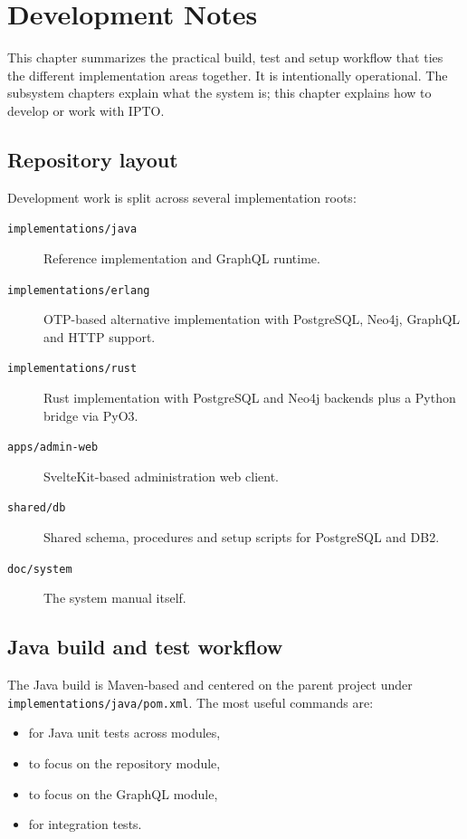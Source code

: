 \section{Development Notes}
\label{sec:DevelopmentNotes}

This chapter summarizes the practical build, test and setup workflow that ties the different implementation areas together. It is intentionally operational. The subsystem chapters explain what the system is; this chapter explains how to develop or work with IPTO.

\subsection{Repository layout}

Development work is split across several implementation roots:
\begin{description}
\item[\texttt{implementations/java}] Reference implementation and GraphQL runtime.
\vspace{.2cm}
\item[\texttt{implementations/erlang}] OTP-based alternative implementation with PostgreSQL, Neo4j, GraphQL and HTTP support.
\vspace{.2cm}
\item[\texttt{implementations/rust}] Rust implementation with PostgreSQL and Neo4j backends plus a Python bridge via PyO3.
\vspace{.2cm}
\item[\texttt{apps/admin-web}] SvelteKit-based administration web client.
\vspace{.2cm}
\item[\texttt{shared/db}] Shared schema, procedures and setup scripts for PostgreSQL and DB2.
\vspace{.2cm}
\item[\texttt{doc/system}] The system manual itself.
\end{description}

\subsection{Java build and test workflow}

The Java build is Maven-based and centered on the parent project under \texttt{implementations/java/pom.xml}. The most useful commands are:
\begin{itemize}
\item {} for Java unit tests across modules,
\item {} to focus on the repository module,
\item {} to focus on the GraphQL module,
\item {} for integration tests.
\end{itemize}

